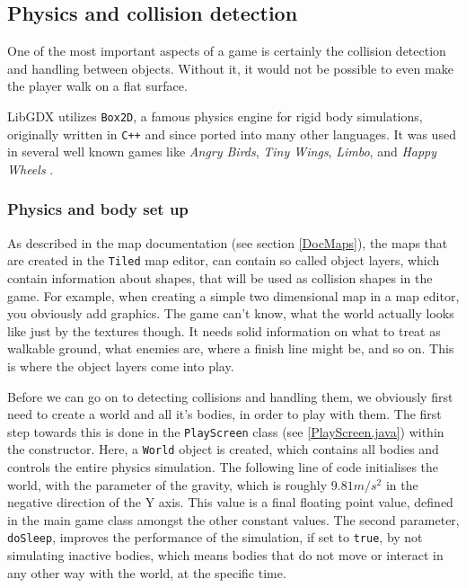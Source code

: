 \documentclass[12p]{article}
\begin{document}
\subsection{Physics and collision detection} \label{DocCollisions}

One of the most important aspects of a game is certainly the collision detection and handling between objects. Without it, it would not be possible to even make the player walk on a flat surface.

LibGDX utilizes \texttt{Box2D}, a famous physics engine for rigid body simulations, originally written in \texttt{C++} and since ported into many other languages. It was used in several well known games like \emph{Angry Birds}, \emph{Tiny Wings}, \emph{Limbo}, and \emph{Happy Wheels} \cite{box2DGithub}\cite{box2DWikipedia}.

\subsubsection{Physics and body set up} \label{DocPhysicsAndBodySetup}

As described in the map documentation (see section \ref{DocMaps}), the maps that are created in the \texttt{Tiled} map editor, can contain so called object layers, which contain information about shapes, that will be used as collision shapes in the game. For example, when creating a simple two dimensional map in a map editor, you obviously add graphics. The game can't know, what the world actually looks like just by the textures though. It needs solid information on what to treat as walkable ground, what enemies are, where a finish line might be, and so on. This is where the object layers come into play.

Before we can go on to detecting collisions and handling them, we obviously first need to create a world and all it's bodies, in order to play with them. The first step towards this is done in the \texttt{PlayScreen} class (see \ref{PlayScreen.java}) within the constructor. Here, a \texttt{World} object is created, which contains all bodies and controls the entire physics simulation. The following line of code initialises the world, with the parameter of the gravity, which is roughly $9.81m/s^2$ in the negative direction of the Y axis. This value is a final floating point value, defined in the main game class amongst the other constant values. The second parameter, \texttt{doSleep}, improves the performance of the simulation, if set to \texttt{true}, by not simulating inactive bodies, which means bodies that do not move or interact in any other way with the world, at the specific time.
\end{document}
